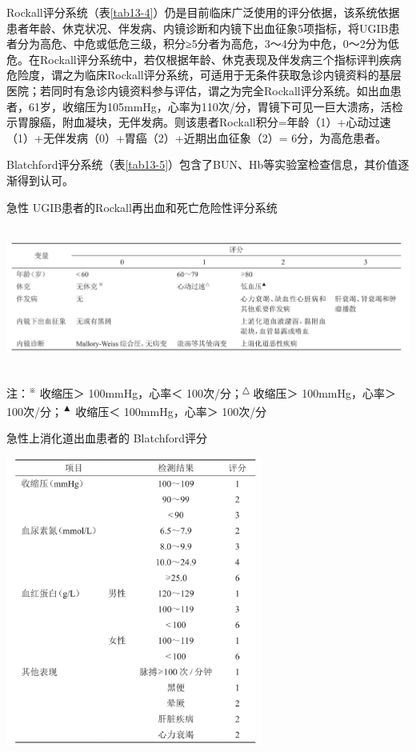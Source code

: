 Rockall评分系统（表\ref{tab13-4}）仍是目前临床广泛使用的评分依据，该系统依据患者年龄、休克状况、伴发病、内镜诊断和内镜下出血征象5项指标，将UGIB患者分为高危、中危或低危三级，积分≥5分者为高危，3～4分为中危，0～2分为低危。在Rockall评分系统中，若仅根据年龄、休克表现及伴发病三个指标评判疾病危险度，谓之为临床Rockall评分系统，可适用于无条件获取急诊内镜资料的基层医院；若同时有急诊内镜资料参与评估，谓之为完全Rockall评分系统。如出血患者，61岁，收缩压为105mmHg，心率为110次/分，胃镜下可见一巨大溃疡，活检示胃腺癌，附血凝块，无伴发病。则该患者Rockall积分=年龄（1）+心动过速（1）+无伴发病（0）+胃癌（2）+近期出血征象（2）=
6分，为高危患者。

Blatchford评分系统（表\ref{tab13-5}）包含了BUN、Hb等实验室检查信息，其价值逐渐得到认可。

\begin{table}[htbp]
\centering
\caption{急性 UGIB患者的Rockall再出血和死亡危险性评分系统}
\label{tab13-4}
\includegraphics[width=6.67708in,height=1.83333in]{./images/Image00056.jpg}
\end{table}

注：\textsuperscript{※} 收缩压＞ 100mmHg，心率＜
100次/分；\textsuperscript{△} 收缩压＞ 100mmHg，心率＞
100次/分；\textsuperscript{▲} 收缩压＜ 100mmHg，心率＞ 100次/分

\begin{table}[htbp]
\centering
\caption{急性上消化道出血患者的 Blatchford评分}
\label{tab13-5}
\includegraphics[width=3.32292in,height=3.75in]{./images/Image00057.jpg}
\end{table}

